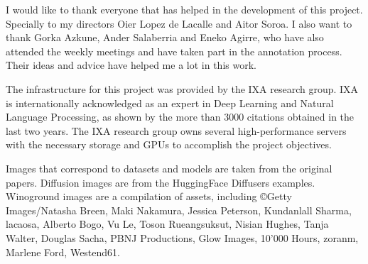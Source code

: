 I would like to thank everyone that has helped in the development of this project. Specially to my directors Oier Lopez de Lacalle and Aitor Soroa. I also want to thank Gorka Azkune, Ander Salaberria and Eneko Agirre, who have also attended the weekly meetings and have taken part in the annotation process. Their ideas and advice have helped me a lot in this work.

The infrastructure for this project was provided by the IXA research group. IXA is internationally acknowledged as an expert in Deep Learning and Natural Language Processing, as shown by the more than 3000 citations obtained in the last two years. The IXA research group owns several high-performance servers with the necessary storage and GPUs to accomplish the project objectives.

Images that correspond to datasets and models are taken from the original papers. Diffusion images are from the HuggingFace Diffusers examples. Winoground images are a compilation of assets, including \copyright Getty Images/Natasha Breen, Maki Nakamura, Jessica Peterson, Kundanlall Sharma, lacaosa, Alberto Bogo, Vu Le, Toson Rueangsuksut, Nisian Hughes, Tanja Walter, Douglas Sacha, PBNJ Productions, Glow Images, 10'000 Hours, zoranm, Marlene Ford, Westend61.